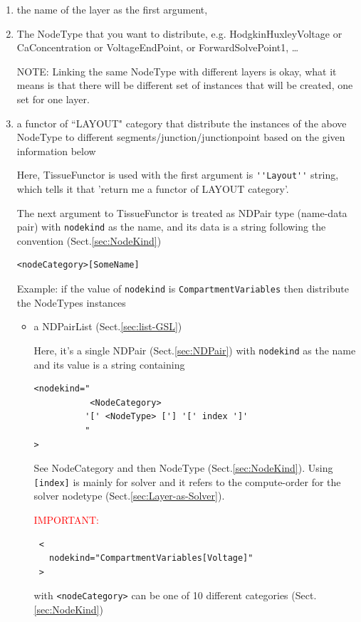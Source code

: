 \begin{enumerate}
  \item the name of the layer as the first argument, 
  
  \item The NodeType that you want to distribute, e.g. HodgkinHuxleyVoltage or
  CaConcentration or VoltageEndPoint, or ForwardSolvePoint1, \ldots
  
NOTE: Linking the same NodeType with different layers is okay, what it means is
that there will be different set of instances that will be created, one set for
one layer.


  \item a functor of ``LAYOUT" category that distribute the instances of the
  above NodeType to different segments/junction/junctionpoint based on the given
  information below

Here, TissueFunctor is used with the first argument is \verb!''Layout''! string,
which tells it that 'return me a functor of LAYOUT category'.

The next argument to TissueFunctor is treated as NDPair type (name-data pair)
with \verb!nodekind! as the name, and its data is a string following the
convention (Sect.\ref{sec:NodeKind})
\begin{verbatim}
<nodeCategory>[SomeName]
\end{verbatim}

Example: if the value of \verb!nodekind! is \verb!CompartmentVariables! then
distribute the NodeTypes instances 
  
  \begin{itemize}
  \item a NDPairList (Sect.\ref{sec:list-GSL})
  
Here, it's a single NDPair (Sect.\ref{sec:NDPair})  with \verb!nodekind! as
the name and its value is a string containing 
\begin{verbatim}
<nodekind="
           <NodeCategory> 
          '[' <NodeType> ['] '[' index ']'
          " 
>
\end{verbatim}
See NodeCategory and then NodeType (Sect.\ref{sec:NodeKind}). Using
\verb![index]! is mainly for solver and it refers to the compute-order for the
solver nodetype (Sect.\ref{sec:Layer-as-Solver}).
  
\textcolor{red}{IMPORTANT:}
\begin{verbatim}
 < 
   nodekind="CompartmentVariables[Voltage]"
 >
\end{verbatim} 


with \verb!<nodeCategory>! can be one of 10 different categories
(Sect.\ref{sec:NodeKind}) 


\end{itemize}
\end{enumerate}
